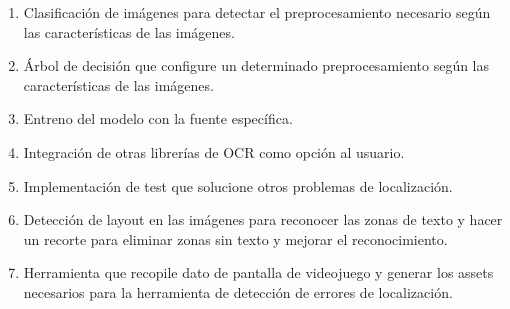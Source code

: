 \begin{enumerate}
	\item Clasificación de imágenes para detectar el preprocesamiento necesario según las características de las imágenes.
	\item Árbol de decisión que configure un determinado preprocesamiento según las características de las imágenes.
	\item Entreno del modelo con la fuente específica.
	\item Integración de otras librerías de OCR como opción al usuario.
	\item Implementación de test que solucione otros problemas de localización.
	\item Detección de layout en las imágenes para reconocer las zonas de texto y hacer un recorte para eliminar zonas sin texto y mejorar el reconocimiento.
	\item Herramienta que recopile dato de pantalla de videojuego y generar los assets necesarios para la herramienta de detección de errores de localización.
\end{enumerate}
